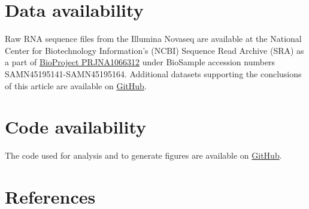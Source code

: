 \documentclass[
  sn-nature,
  lineno, referee]{sn-jnl}
\begin{document}
\section{Data availability}\label{data-availability}

Raw RNA sequence files from the Illumina Novaseq are available at the
National Center for Biotechnology Information's (NCBI) Sequence Read
Archive (SRA) as a part of
\href{https://www.ncbi.nlm.nih.gov/bioproject/PRJNA1066312/}{BioProject
PRJNA1066312} under BioSample accession numbers
SAMN45195141-SAMN45195164. Additional datasets supporting the
conclusions of this article are available on
\href{https://github.com/amason30/Mason_MetaT_XXX_2024}{GitHub}.

\section{Code availability}\label{code-availability}

The code used for analysis and to generate figures are available on
\href{https://github.com/amason30/Mason_MetaT_XXX_2024}{GitHub}.

\section{References}\label{references}
\end{document}
